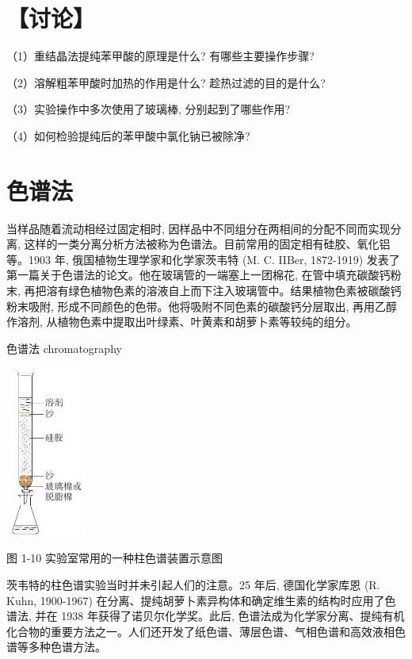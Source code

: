 \documentclass[10pt]{article}
\begin{document}
\section*{【讨论】}

（1）重结晶法提纯苯甲酸的原理是什么? 有哪些主要操作步骤?

（2）溶解粗苯甲酸时加热的作用是什么? 趁热过滤的目的是什么?

（3）实验操作中多次使用了玻璃棒, 分别起到了哪些作用?

（4）如何检验提纯后的苯甲酸中氯化钠已被除净?

\section*{色谱法}

当样品随着流动相经过固定相时, 因样品中不同组分在两相间的分配不同而实现分离, 这样的一类分离分析方法被称为色谱法。目前常用的固定相有硅胶、氧化铝等。1903 年, 俄国植物生理学家和化学家茨韦特 (M. C. IIBer, 1872-1919) 发表了第一篇关于色谱法的论文。他在玻璃管的一端塞上一团棉花, 在管中填充碳酸钙粉末, 再把溶有绿色植物色素的溶液自上而下注入玻璃管中。结果植物色素被碳酸钙粉末吸附, 形成不同颜色的色带。他将吸附不同色素的碳酸钙分层取出, 再用乙醇作溶剂, 从植物色素中提取出叶绿素、叶黄素和胡萝卜素等较纯的组分。

\begin{mdframed}

色谱法 chromatography

\end{mdframed}

\begin{center}
\includegraphics[max width=0.2\textwidth]{images/0190efc5-b58a-7c43-bfb0-e0a030df9cfd_21_870871.jpg}
\end{center}

图 1-10 实验室常用的一种柱色谱装置示意图

茨韦特的柱色谱实验当时并未引起人们的注意。25 年后, 德国化学家库恩 (R. Kuhn, 1900-1967) 在分离、提纯胡萝卜素异构体和确定维生素的结构时应用了色谱法, 并在 1938 年获得了诺贝尔化学奖。此后, 色谱法成为化学家分离、提纯有机化合物的重要方法之一。人们还开发了纸色谱、薄层色谱、气相色谱和高效液相色谱等多种色谱方法。
\end{document}
